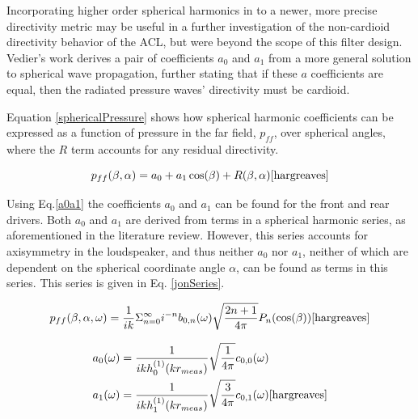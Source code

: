 \documentclass{report}
\begin{document}
            Incorporating higher order spherical harmonics in to a newer, more precise directivity metric may be useful in a further investigation of the non-cardioid directivity behavior of the ACL, but were beyond the scope of this filter design.
            Vedier's work derives a pair of coefficients $a_0$ and $a_1$ from a more general solution to spherical wave propagation, further stating that if these $a$ coefficients are equal, then the radiated pressure waves' directivity must be cardioid.

            Equation \ref{sphericalPressure} shows how spherical harmonic coefficients can be expressed as a function of pressure in the far field, $p_{ff}$, over spherical angles, where the $R$ term accounts for any residual directivity.

            \begin{equation}
                p_{ff}(\beta,\alpha) = a_0 + a_1 \cos(\beta) + R(\beta,\alpha)
                \label{sphericalPressure}
                \cite{hargreaves}
            \end{equation}
            

            Using Eq.\ref{a0a1} the coefficients $a_0$ and $a_1$ can be found for the front and rear drivers.
            Both $a_0$ and $a_1$ are derived from terms in a spherical harmonic series, as aforementioned in the literature review.
            However, this series accounts for axisymmetry in the loudspeaker, and thus neither $a_0$ nor $a_1$, neither of which are dependent on the spherical coordinate angle $\alpha$, can be found as terms in this series.
            This series is given in Eq. \ref{jonSeries}.
            
            \begin{equation}
                p_{ff}(\beta,\alpha,\omega) = \frac{1}{ik} \Sigma_{n=0}^{\infty}i^{-n}b_{0,n}(\omega)\sqrt{\frac{2n+1}{4\pi}}P_n(\cos(\beta))
                \label{jonSeries}
                \cite{hargreaves}
            \end{equation}

            \begin{equation}
                \begin{split}
                    a_0(\omega) &= \frac{1}{ikh_0^{(1)}(kr_{meas})} \sqrt{\frac{1}{4\pi}} c_{0,0}(\omega) \\
                    a_1(\omega) &= \frac{1}{ikh_1^{(1)}(kr_{meas})} \sqrt{\frac{3}{4\pi}} c_{0,1}(\omega)
                    \label{a0a1}\cite{hargreaves}
                \end{split}
            \end{equation}
\end{document}

